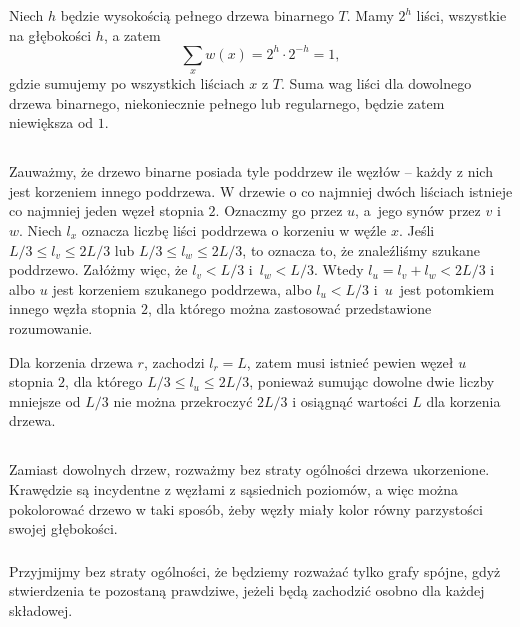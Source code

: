 Niech $h$ będzie wysokością pełnego drzewa binarnego $T$. Mamy $2^h$ liści, wszystkie na głębokości $h$, a zatem
\[
	\sum_{x}w(x)=2^h\cdot 2^{-h}=1,
\]
gdzie sumujemy po wszystkich liściach $x$ z $T$. Suma wag liści dla dowolnego drzewa binarnego, niekoniecznie pełnego lub regularnego, będzie zatem niewiększa od $1$.

\subsection{} %
Zauważmy, że drzewo binarne posiada tyle poddrzew ile węzłów -- każdy z nich jest korzeniem innego poddrzewa. W drzewie o co najmniej dwóch liściach istnieje co najmniej jeden węzeł stopnia $2$. Oznaczmy go przez $u$, a~jego synów przez $v$ i $w$.  Niech $l_x$ oznacza liczbę liści poddrzewa o korzeniu w węźle $x$. Jeśli $L/3\le l_v\le 2L/3$ lub $L/3\le l_w\le 2L/3$, to oznacza to, że znaleźliśmy szukane poddrzewo. Załóżmy więc, że $l_v<L/3$ i~$l_w<L/3$. Wtedy $l_u=l_v+l_w<2L/3$ i albo $u$ jest korzeniem szukanego poddrzewa, albo $l_u<L/3$ i~$u$~jest potomkiem innego węzła stopnia $2$, dla którego można zastosować przedstawione rozumowanie.

Dla korzenia drzewa $r$, zachodzi $l_r=L$, zatem musi istnieć pewien węzeł $u$ stopnia $2$, dla którego $L/3\le l_u\le 2L/3$, ponieważ sumując dowolne dwie liczby mniejsze od $L/3$ nie można przekroczyć $2L/3$ i osiągnąć wartości $L$ dla korzenia drzewa.

\problems

\subsection{} %
\subsubsection{} %
Zamiast dowolnych drzew, rozważmy bez straty ogólności drzewa ukorzenione. Krawędzie są incydentne z węzłami z sąsiednich poziomów, a więc można pokolorować drzewo w taki sposób, żeby węzły miały kolor równy parzystości swojej głębokości.

\subsubsection{} %
Przyjmijmy bez straty ogólności, że będziemy rozważać tylko grafy spójne, gdyż stwierdzenia te pozostaną prawdziwe, jeżeli będą zachodzić osobno dla każdej składowej.
\bigskip

